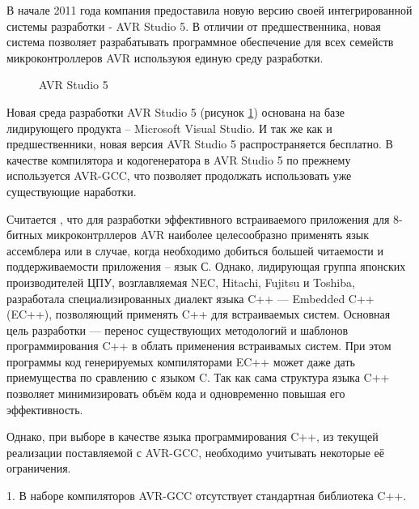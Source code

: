 \begin{par}
В начале 2011 года компания предоставила новую версию своей интегрированной системы
разработки - AVR Studio 5. В отличии от предшественника, новая система позволяет разрабатывать
программное обеспечение для всех семейств микроконтроллеров AVR используюя единую среду разработки.
\end{par}

\begin{par}

\begin{figure}[ht]
	\caption{AVR Studio 5}
	\label{img:avr_studio}
\end{figure}


Новая среда разработки AVR Studio 5 (рисунок \ref{img:avr_studio}) основана на базе лидирующего
продукта -- Microsoft Visual Studio.
И так же как и предшественники, новая версия AVR Studio 5  распространяется бесплатно.
В качестве компилятора и кодогенератора в AVR Studio 5 по прежнему используется AVR-GCC,
что позволяет продолжать использовать уже существующие наработки.
\end{par}

\begin{par}
Считается \cite{avrev}, что для разработки эффективного встраиваемого приложения для 8-битных микроконтрллеров
AVR наиболее целесообразно применять язык ассемблера или в случае, когда необходимо добиться
большей читаемости и поддерживаемости приложения -- язык С.
Однако, лидирующая группа японских производителей ЦПУ, возглавляемая NEC, Hitachi, Fujitsu и Toshiba,
разработала специализированных диалект языка C++ --- Embedded C++ (EC++), позволяющий применять
C++ для встраиваемых систем. Основная цель разработки --- перенос существующих методологий и шаблонов
программирования C++ в облать применения встраивамых систем.
При этом программы код генерируемых компиляторами EC++ может даже дать приемущества по сравлению
с языком C. Так как сама структура языка C++ позволяет минимизировать объём кода и одновременно
повышая его эффективность.
\end{par}

\begin{par}
Однако, при выборе в качестве языка программирования C++, из текущей реализации поставляемой с AVR-GCC,
необходимо учитывать некоторые её ограничения.
\end{par}

\begin{par}
 	1. В наборе компиляторов AVR-GCC отсутствует стандартная библиотека C++.
\end{par}

